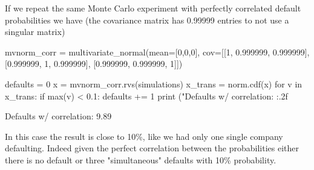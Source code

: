 If we repeat the same Monte Carlo experiment with perfectly correlated default probabilities we have (the covariance matrix has 0.99999 entries to not use a singular matrix)

\begin{ipython}
mvnorm_corr = multivariate_normal(mean=[0,0,0], 
                                  cov=[[1, 0.999999, 0.999999],
                                       [0.999999, 1, 0.999999],
                                       [0.999999, 0.999999, 1]])

defaults = 0
x = mvnorm_corr.rvs(simulations)
x_trans = norm.cdf(x)
for v in x_trans:
    if max(v) < 0.1:
        defaults += 1
print ("Defaults w/ correlation: {:.2f}%
\end{ipython}
\begin{ioutput}
Defaults w/ correlation: 9.89%
\end{ioutput}
In this case the result is close to 10\%, like we had only one single company defaulting. 
Indeed given the perfect correlation between the probabilities either there is no default or three "simultaneous" defaults with 10\% probability.

